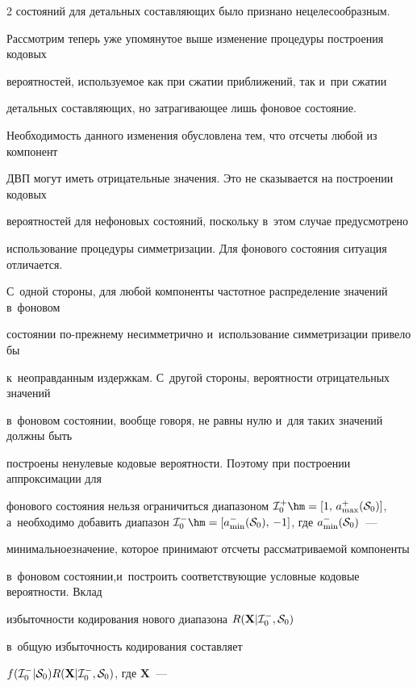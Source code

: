 \begin{multicols}{2}
 со\-сто\-яний для детальных со\-став\-ля\-ющих было признано нецелесообразным.



Рассмотрим теперь уже упомянутое выше изменение процедуры построения кодовых

 вероятностей, используемое как при сжатии приближений, так и~при сжатии 

 детальных составляющих, но затрагивающее лишь фоновое состояние. 

 Необходимость данного изменения обусловлена тем, что отсчеты любой из компонент 

 ДВП могут иметь отрицательные значения. Это не сказывается на построении кодовых 

 вероятностей для нефоновых состояний, поскольку в~этом случае предусмотрено 

 использование процедуры симметризации. Для фонового состояния ситуация отличается. 

 С~одной стороны, для любой компоненты частотное распределение значений в~фоновом 

 со\-сто\-янии по-преж\-не\-му несимметрично и~использование сим\-мет\-ри\-за\-ции привело бы 

 к~неоправданным издержкам. С~другой стороны, вероятности отрицательных значений 

 в~фоновом состоянии, вообще говоря, не равны нулю и~для таких значений должны быть 

 построены ненулевые кодовые вероятности. Поэтому при построении аппроксимации для 

 фонового состояния нельзя ограничиться диапазоном ${\cal I}_0^+\hm=

 [1,\,a_{\max}^+({\cal S}_0)]$, а~необходимо добавить диапазон ${\cal I}_0^-\hm=

 [a_{\min}^-({\cal S}_0),\,-1]$, где $a_{\min}^-({\cal S}_0)$~--- 

 минимальное\linebreak значение, которое принимают отсчеты рассмат\-риваемой компоненты 

 в~фоновом состоянии,\linebreak и~построить соответствующие условные кодовые вероятности. Вклад 

 избыточности кодирования нового диапазона $R(\mathbf{X}|{\cal I}_0^-,{\cal S}_0)$ 

 в~общую избыточность кодирования составляет 

 $f({\cal I}_0^-|{\cal S}_0)R(\mathbf{X}|{\cal I}_0^-,{\cal S}_0)$, где $\mathbf{X}$~--- 


\end{multicols}

